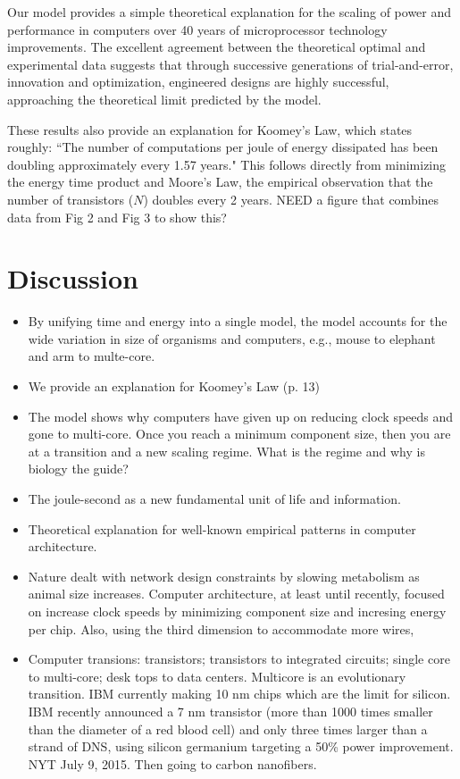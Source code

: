 \documentclass[12pt]{article}
\begin{document}
Our model provides a simple theoretical explanation for the scaling of 
power and performance in computers over 40 years of microprocessor 
technology improvements.  The excellent agreement between the 
theoretical optimal and experimental data suggests that through 
successive generations of trial-and-error, innovation and 
optimization, engineered designs are highly successful, approaching 
the theoretical limit predicted by the model.

These results also provide an explanation for Koomey's Law, which states roughly: ``The number of computations per joule of energy dissipated has been doubling approximately every 1.57 years." This follows directly from minimizing the energy time product and Moore's Law, the empirical observation that the number of transistors ($N$) doubles every 2 years. NEED a figure that combines data from Fig 2 and Fig 3 to show this?

\section{Discussion}

\begin{itemize}
\item By unifying time and energy into a single model, the model
  accounts for the wide variation in size of organisms and computers,
  e.g., mouse to elephant and arm to multe-core.

\item We provide an explanation for Koomey's Law (p. 13)

\item The model shows why computers have given up on reducing clock
  speeds and gone to multi-core.  Once you reach a minimum component
  size, then you are at a transition and a new scaling regime.  What
  is the regime and why is biology the guide?

\item The joule-second as a new fundamental unit of life and
  information.

\item Theoretical explanation for well-known empirical patterns in
  computer architecture.

\item Nature dealt with network design constraints by slowing
  metabolism as animal size increases.  Computer architecture, at
  least until recently, focused on increase clock speeds by minimizing
  component size and incresing energy per chip.  Also, using the third dimension to accommodate more wires, 

\item Computer transions: transistors; transistors to
  integrated circuits; single core to multi-core; desk tops to data centers.
Multicore is an evolutionary transition.  IBM currently making 10 nm chips which are the limit for
  silicon.  IBM recently announced a 7 nm
transistor (more than 1000 times smaller than the diameter of a red
blood cell) and only three times larger than a strand of DNS, using
silicon germanium targeting a 50\% power improvement.  NYT July 9,
2015.  Then going to carbon nanofibers. 

\end{itemize}
\end{document}
